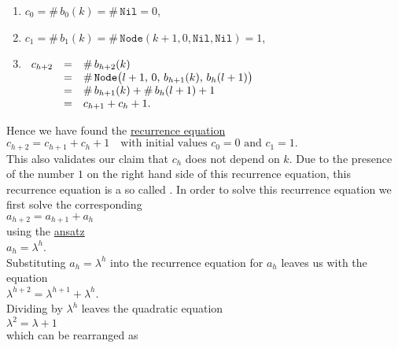 \begin{enumerate}
\item $c_0 = \#\, b_0(k) = \#\, \mathtt{Nil} = 0$,
\item $c_1 = \#\, b_1(k) = \#\, \mathtt{Node}(k+1,0,\mathtt{Nil}, \mathtt{Nil}) = 1$, 
\item$\begin{array}[t]{lcl}
       c_{h+2} & = & \#\, b_{h+2}(k) \\
               & = & \#\,\mathtt{Node}\bigl(l+1,\,0,\,b_{h+1}(k),\,b_h(l+1)\bigr) \\
               & = & \#\, b_{h+1}(k) + \#\, b_h(l+1) + 1 \\
               & = & c_{h+1} + c_h + 1.
       \end{array}$
\end{enumerate}
Hence we have found the \href{https://en.wikipedia.org/wiki/Recurrence_relation}{recurrence equation}
\\[0.2cm]
\hspace*{1.3cm}
$c_{h+2} = c_{h+1} + c_h + 1 \quad \mbox{with initial values $c_0 = 0$ and $c_1 = 1$}.$
\\[0.2cm]
This also validates our claim that $c_h$ does not depend on $k$.  Due to the presence of the number $1$ on the
right hand side of this recurrence equation, this recurrence equation is a so called 
.  In order to solve this recurrence
equation we first solve the corresponding  
\\[0.2cm]
\hspace*{1.3cm}
$a_{h+2} = a_{h+1} + a_h$
\\[0.2cm]
using the \href{https://en.wikipedia.org/wiki/Ansatz}{ansatz}
\\[0.2cm]
\hspace*{1.3cm}
$a_h = \lambda^h$.
\\[0.2cm]
Substituting $a_h = \lambda^h$ into the recurrence equation for $a_h$ leaves us with the equation
\\[0.2cm]
\hspace*{1.3cm}
$\lambda^{h+2} = \lambda^{h+1} + \lambda^{h}$.
\\[0.2cm]
Dividing by $\lambda^h$ leaves the quadratic equation
\\[0.2cm]
\hspace*{1.3cm}
$\lambda^2 = \lambda + 1$
\\[0.2cm]
which can be rearranged as
\\[0.2cm]
\hspace*{1.3cm}
